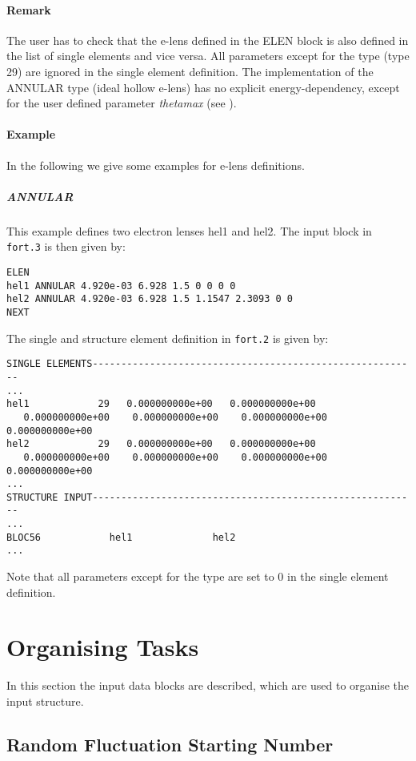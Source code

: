 \documentclass[a4paper,11pt]{report}
\begin{document}
\paragraph{Remark} The user has to check that the e-lens defined in the ELEN block is also defined in the list of single elements and vice versa. All parameters except for the type (type 29) are ignored in the single element definition.
The implementation of the ANNULAR type (ideal hollow e-lens) has no explicit energy-dependency, except for the user defined parameter \emph{thetamax} (see \cite{sixphys}).

\paragraph{Example} In the following we give some examples for e-lens definitions.

\subparagraph{ANNULAR} This example defines two electron lenses hel1 and hel2. The input block in \verb|fort.3| is then given by:
\begin{verbatim}
ELEN
hel1 ANNULAR 4.920e-03 6.928 1.5 0 0 0 0
hel2 ANNULAR 4.920e-03 6.928 1.5 1.1547 2.3093 0 0
NEXT
\end{verbatim}
The single and structure element definition in \verb|fort.2| is given by:
\begin{verbatim}
SINGLE ELEMENTS---------------------------------------------------------
...
hel1            29   0.000000000e+00   0.000000000e+00 
   0.000000000e+00    0.000000000e+00    0.000000000e+00    0.000000000e+00
hel2            29   0.000000000e+00   0.000000000e+00   
   0.000000000e+00    0.000000000e+00    0.000000000e+00    0.000000000e+00
...
STRUCTURE INPUT---------------------------------------------------------
...
BLOC56            hel1              hel2
...
\end{verbatim}
Note that all parameters except for the type are set to 0 in the single element definition.

\section{Organising Tasks}

In this section the input data blocks are described, which are used to
organise the input structure.

\subsection{Random Fluctuation Starting Number} \label{FluNum}
\end{document}
